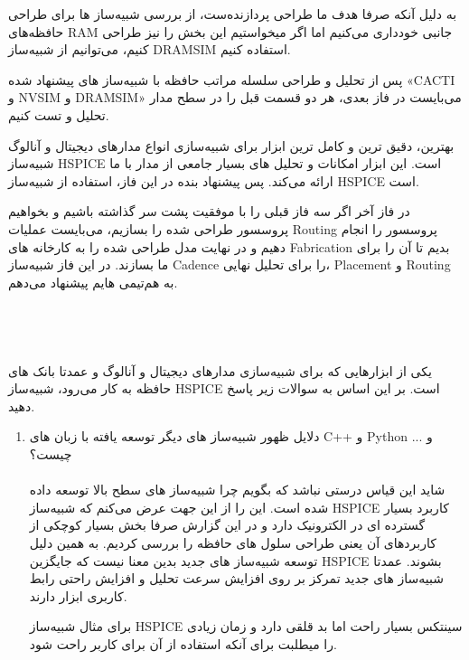 \documentclass[12pt]{exam}
\begin{document}
\begin{questions}
  به دلیل آنکه صرفا هدف ما طراحی پردازنده‌ست، از بررسی شبیه‌ساز ها برای طراحی حافظه‌های RAM جانبی خودداری می‌کنیم اما اگر میخواستیم این بخش را نیز طراحی کنیم، می‌توانیم از شبیه‌ساز DRAMSIM استفاده کنیم.
  
  پس از تحلیل و طراحی سلسله مراتب حافظه با شبیه‌ساز های پیشنهاد شده «CACTI و NVSIM و DRAMSIM» می‌بایست در فاز بعدی، هر دو قسمت قبل را در سطح مدار تحلیل و تست کنیم.
  
  بهترین، دقیق ترین و کامل ترین ابزار برای شبیه‌سازی انواع مدارهای دیجیتال و آنالوگ شبیه‌ساز HSPICE است. این ابزار امکانات و تحلیل های بسیار جامعی از مدار با ما ارائه می‌کند. پس پیشنهاد بنده در این فاز، استفاده از شبیه‌ساز HSPICE است.
  
  در فاز آخر اگر سه فاز قبلی را با موفقیت پشت سر گذاشته باشیم و بخواهیم پروسسور طراحی شده را بسازیم، می‌بایست عملیات Routing پروسسور را انجام دهیم و در نهایت مدل طراحی شده را به کارخانه های Fabrication بدیم تا آن را برای ما بسازند. در این فاز شبیه‌ساز Cadence را برای تحلیل نهایی، Placement و Routing به هم‌تیمی هایم پیشنهاد می‌دهم. \\ \\ \\ \\ \\
 
 





 
 
 \question 
 یکی از ابزار‌هایی که برای شبیه‌سازی مدار‌های دیجیتال و آنالوگ و عمدتا بانک های حافظه به کار می‌رود، شبیه‌ساز HSPICE است. بر این اساس به سوالات زیر پاسخ دهید.
 
 \begin{enumerate}
 	\item دلایل ظهور شبیه‌ساز های دیگر توسعه یافته با زبان های C++ و Python و ... چیست؟ \\ \\
 	شاید این قیاس درستی نباشد که بگویم چرا شبیه‌ساز های سطح بالا توسعه داده شده است. این را از این جهت عرض می‌کنم که شبیه‌ساز HSPICE کاربرد بسیار گسترده ای در الکترونیک دارد و در این گزارش صرفا بخش بسیار کوچکی از کاربردهای آن یعنی طراحی سلول های حافظه را بررسی کردیم. به همین دلیل توسعه شبیه‌ساز های جدید بدین معنا نیست که جایگزین HSPICE بشوند. عمدتا شبیه‌ساز های جدید تمرکز بر روی افزایش سرعت تحلیل و افزایش راحتی رابط کاربری ابزار دارند.
 	
 	برای مثال شبیه‌ساز HSPICE سینتکس بسیار راحت اما بد قلقی دارد و زمان زیادی را میطلبت برای آنکه استفاده از آن برای کاربر راحت شود.
 	

\end{enumerate}
\end{questions}
\end{document}
